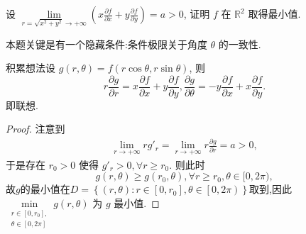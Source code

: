 \documentclass[../../main.tex]{subfiles}%
\begin{document}
\begin{example}
设 \( \lim\limits_{r = \sqrt{x^2 + y^2} \to +\infty} \left( x \frac{\partial f}{\partial x} + y \frac{\partial f}{\partial y} \right) = a > 0 \), 证明 \( f \) 在 \( \mathbb{R}^2 \) 取得最小值.
\end{example}
\begin{remark}
本题关键是有一个隐藏条件:条件极限关于角度 \( \theta \) 的一致性.
\end{remark}
\begin{note}
积累想法设 \( g(r, \theta) = f(r \cos \theta, r \sin \theta) \), 则
\[
r \frac{\partial g}{\partial r} = x \frac{\partial f}{\partial x} + y \frac{\partial f}{\partial y}, \frac{\partial g}{\partial \theta} = -y \frac{\partial f}{\partial x} + x \frac{\partial f}{\partial y}.
\]
即联想.
\end{note}
\begin{proof}

注意到
\begin{align*}
\lim\limits_{r \to +\infty} r g'_r = \lim\limits_{r \to +\infty} r \frac{\partial g}{\partial r}= a > 0,
\end{align*}
于是存在 \( r_0 > 0 \) 使得 \( g'_r > 0, \forall r \geqslant r_0 \). 则此时
\[
g(r, \theta) \geqslant g(r_0, \theta), \forall r \geqslant r_0, \theta \in [0, 2\pi),
\]
故$g$的最小值在$D=\left\{ \left( r,\theta \right) :r\in \left[ 0,r_0 \right] ,\theta \in \left[ 0,2\pi \right) \right\}$取到,因此\( \min\limits_{\substack{r \in [0, r_0], \\ \theta \in [0, 2\pi]}} g(r, \theta) \) 为 \( g \) 最小值.

\end{proof}
\end{document}
